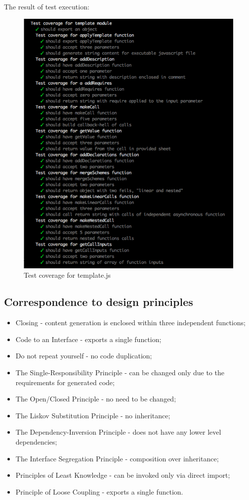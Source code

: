 The result of test execution:
\begin{figure}[H]
	\centering
	\includegraphics[width=\linewidth]{grafiken/testTemplate.png}
	\caption{Test coverage for template.js}
	\label{fig:testTemplate}
\end{figure}

\subsection{Correspondence to design principles}
\begin{itemize}
	\item Closing - content generation is enclosed within three independent functions;
	\item Code to an Interface - exports a single function;
	\item Do not repeat yourself - no code duplication;
	\item The Single-Responsibility Principle - can be changed only due to the requirements for generated code;
	\item The Open/Closed Principle - no need to be changed;
	\item The Liskov Substitution Principle - no inheritance;
	\item The Dependency-Inversion Principle - does not have any lower level dependencies;
	\item The Interface Segregation Principle - composition over inheritance;
	\item Principles of Least Knowledge - can be invoked only via direct import;
	\item Principle of Loose Coupling - exports a single function.
\end{itemize}

